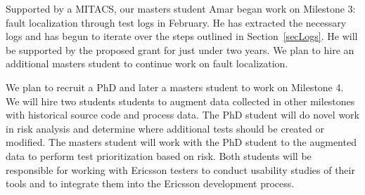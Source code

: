 Supported by a MITACS, our masters student Amar began work on Milestone 3: fault localization through test logs in February. He has extracted the necessary logs and has begun to iterate over the steps outlined in Section~\ref{secLogs}. He will be supported by the proposed grant for just under two years. We plan to hire an additional masters student to continue work on fault localization.

We plan to recruit a PhD and later a masters student to work on Milestone 4. We will hire two students students to augment data collected in other milestones with historical source code and process data. The PhD student will do novel work in risk analysis and determine where additional tests should be created or modified. The masters student will work with the PhD student to the augmented data to perform test prioritization based on risk. Both students will be responsible for working with Ericsson testers to conduct usability studies of their tools and to integrate them into the Ericsson development process.

